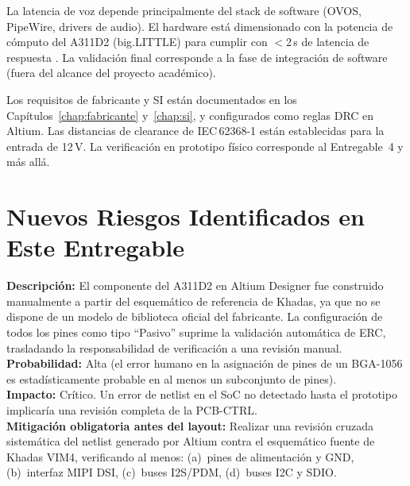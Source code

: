 \begin{riskbox}
  La latencia de voz depende principalmente del stack de software (OVOS,
  PipeWire, drivers de audio). El hardware está dimensionado con la potencia
  de cómputo del A311D2 (big.LITTLE) para cumplir con $<$2\,s de latencia
  de respuesta . La validación final corresponde a la fase
  de integración de software (fuera del alcance del proyecto académico).
\end{riskbox}

\begin{riskbox}
  Los requisitos de fabricante y SI están documentados en los Capítulos~\ref{chap:fabricante}
  y~\ref{chap:si}, y configurados como reglas DRC en Altium. Las distancias de
  clearance de IEC\,62368-1  están establecidas para la entrada de
  12\,V. La verificación en prototipo físico corresponde al Entregable~4 y más allá.
\end{riskbox}

\section{Nuevos Riesgos Identificados en Este Entregable}
\label{sec:risk_nuevos}

\begin{riskbox}
  \textbf{Descripción:} El componente del A311D2 en Altium Designer fue construido
  manualmente a partir del esquemático de referencia de Khadas, ya que no se dispone
  de un modelo de biblioteca oficial del fabricante. La configuración de todos los
  pines como tipo ``Pasivo'' suprime la validación automática de ERC, trasladando
  la responsabilidad de verificación a una revisión manual.\\
  \textbf{Probabilidad:} Alta (el error humano en la asignación de pines de un
  BGA-1056 es estadísticamente probable en al menos un subconjunto de pines).\\
  \textbf{Impacto:} Crítico. Un error de netlist en el SoC no detectado hasta el
  prototipo implicaría una revisión completa de la PCB-CTRL.\\
  \textbf{Mitigación obligatoria antes del layout:} Realizar una revisión cruzada
  sistemática del netlist generado por Altium contra el esquemático fuente de
  Khadas VIM4, verificando al menos: (a)~pines de alimentación y GND,
  (b)~interfaz MIPI DSI, (c)~buses I2S/PDM, (d)~buses I2C y SDIO.
\end{riskbox}

